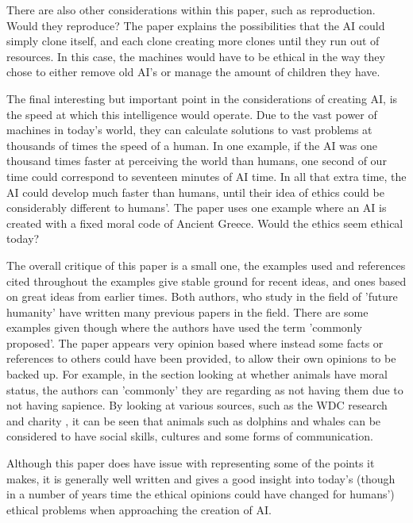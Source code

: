 \documentclass[article]{IEEEtran}
\begin{document}
There are also other considerations within this paper, such as reproduction. Would they reproduce? The paper explains the possibilities that the AI could simply clone itself, and each clone creating more clones until they run out of resources. In this case, the machines would have to be ethical in the way they chose to either remove old AI's or manage the amount of children they have.\par
The final interesting but important point in the considerations of creating AI, is the speed at which this intelligence would operate. Due to the vast power of machines in today's world, they can calculate solutions to vast problems at thousands of times the speed of a human. In one example, if the AI was one thousand times faster at perceiving the world than humans, one second of our time could correspond to seventeen minutes of AI time. In all that extra time, the AI could develop much faster than humans, until their idea of ethics could be considerably different to humans'. The paper uses one example where an AI is created with a fixed moral code of Ancient Greece. Would the ethics seem ethical today?  \par
The overall critique of this paper is a small one, the examples used and references cited throughout the examples give stable ground for recent ideas, and ones based on great ideas from earlier times. Both authors, who study in the field of 'future humanity' have written many previous papers in the field. There are some examples given though where the authors have used the term 'commonly proposed'. The paper appears very opinion based where instead some facts or references to others could have been provided, to allow their own opinions to be backed up. For example, in the section looking at whether animals have moral status, the authors can 'commonly' they are regarding as not having them due to not having sapience. By looking at various sources, such as the WDC research and charity \cite{whales},  it can be seen that animals such as dolphins and whales can be considered to have social skills, cultures and some forms of communication. \par 
Although this paper does have issue with representing some of the points it makes, it is generally well written and gives a good insight into today's (though in a number of years time the ethical opinions could have changed for humans') ethical problems when approaching the creation of AI.
\end{document}
